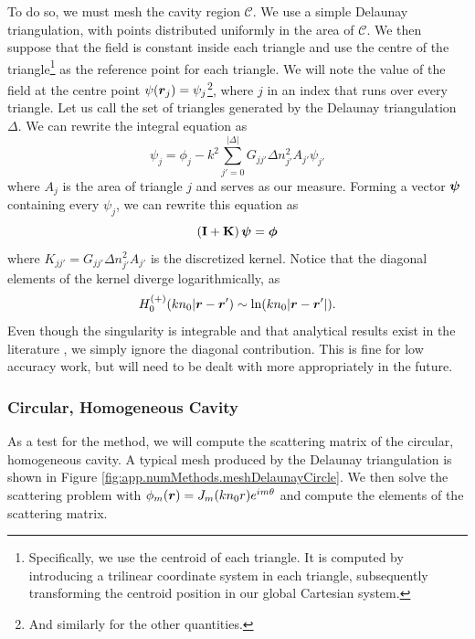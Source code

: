 To do so, we must mesh the cavity region $\mathcal{C}$. We use a simple Delaunay triangulation, 
with points distributed uniformly in the area of $\mathcal{C}$. We then suppose that the field
is constant inside each triangle and use the centre of the triangle\footnote{Specifically, 
we use the centroid of each triangle. It is computed by introducing a trilinear coordinate
system in each triangle, subsequently transforming the centroid position
in our global Cartesian system.} as the reference point
for each triangle. We will note the value of the field at the centre point  
$\psi(\boldsymbol{r}_j)=\psi_j$\footnote{And similarly for the other quantities.}, where $j$
in an index that runs over every triangle. Let us call the set of triangles generated by 
the Delaunay triangulation $\Delta$. We can rewrite the integral equation as
	\begin{equation}
		\psi_j = \phi_j - k^2\sum_{j'=0}^{|\Delta|} G_{jj'}\Delta n^2_{j'}A_{j'}\psi_{j'}
	\end{equation}
where $A_j$ is the area of triangle $j$ and serves as our measure. Forming
a vector $\boldsymbol{\psi}$ containing every $\psi_j$, we can rewrite this 
equation as
	\begin{equation}
		\left(\mathbf{I}+\mathbf{K}\right)\boldsymbol{\psi} = \boldsymbol{\phi}
	\end{equation}
where $K_{jj'} = G_{jj'}\Delta n^2_{j'}A_{j'}$ is the discretized kernel. Notice 
that the diagonal elements of the kernel diverge logarithmically, as
	\begin{equation}
		H_{0}^{(+)}(kn_0|\boldsymbol{r}-\boldsymbol{r}') \sim \ln(kn_0|\boldsymbol{r}-\boldsymbol{r}'|).
	\end{equation}
Even though the singularity is integrable and that analytical results
exist in the literature \cite{YAG1980}, we simply ignore the diagonal
contribution. This is fine for low accuracy work, but will need to be
dealt with more appropriately in the future.

\subsubsection{Circular, Homogeneous Cavity}
As a test for the method, we will compute the scattering
matrix of the circular, homogeneous cavity. A typical mesh 
produced by the Delaunay triangulation is shown in Figure
\ref{fig:app.numMethods.meshDelaunayCircle}. We then solve
the scattering problem with $\phi_m(\boldsymbol{r})=J_m(kn_0r)e^{im\theta}$
and compute the elements of the scattering matrix. 

